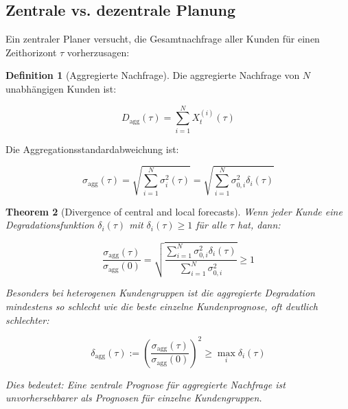 \documentclass[a4paper, 12pt, twoside, openright]{report}
\newtheorem{theorem}{Theorem}[section]
\theoremstyle{definition}
\newtheorem{definition}[theorem]{Definition}
\theoremstyle{definition}
\begin{document}
\subsection{Zentrale vs. dezentrale Planung}

Ein zentraler Planer versucht, die Gesamtnachfrage aller Kunden für einen Zeithorizont $\tau$ vorherzusagen:

\begin{definition}[Aggregierte Nachfrage]
Die aggregierte Nachfrage von $N$ unabhängigen Kunden ist:

\begin{equation}
D_{\text{agg}}(\tau) = \sum_{i=1}^N X_t^{(i)}(\tau)
\label{eq:aggregate_demand}
\end{equation}

Die Aggregationsstandardabweichung ist:

\begin{equation}
\sigma_{\text{agg}}(\tau) = \sqrt{\sum_{i=1}^N \sigma_i^2(\tau)} = \sqrt{\sum_{i=1}^N \sigma_{0,i}^2 \delta_i(\tau)}
\end{equation}
\end{definition}

\begin{theorem}[Divergence of central and local forecasts]
\label{thm:forecast_divergence}
Wenn jeder Kunde eine Degradationsfunktion $\delta_i(\tau)$ mit $\delta_i(\tau) \geq 1$ für alle $\tau$ hat, dann:

\begin{equation}
\frac{\sigma_{\text{agg}}(\tau)}{\sigma_{\text{agg}}(0)} = \sqrt{\frac{\sum_{i=1}^N \sigma_{0,i}^2 \delta_i(\tau)}{\sum_{i=1}^N \sigma_{0,i}^2}} \geq 1
\end{equation}

Besonders bei heterogenen Kundengruppen ist die aggregierte Degradation \emph{mindestens} so schlecht wie die beste einzelne Kundenprognose, oft deutlich schlechter:

\begin{equation}
\delta_{\text{agg}}(\tau) := \left(\frac{\sigma_{\text{agg}}(\tau)}{\sigma_{\text{agg}}(0)}\right)^2 \geq \max_i \delta_i(\tau)
\end{equation}

Dies bedeutet: Eine zentrale Prognose für aggregierte Nachfrage ist \emph{unvorhersehbarer} als Prognosen für einzelne Kundengruppen.
\end{theorem}
\end{document}
